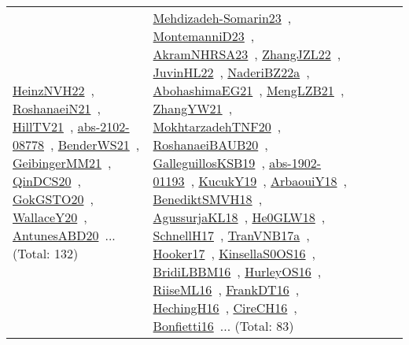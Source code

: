 {\begin{longtable}{lp{3cm}>{\raggedright\arraybackslash}p{6cm}>{\raggedright\arraybackslash}p{6cm}>{\raggedright\arraybackslash}p{8cm}}
\href{../works/HeinzNVH22.pdf}{HeinzNVH22}~\cite{HeinzNVH22}, \href{../works/RoshanaeiN21.pdf}{RoshanaeiN21}~\cite{RoshanaeiN21}, \href{../works/HillTV21.pdf}{HillTV21}~\cite{HillTV21}, \href{../works/abs-2102-08778.pdf}{abs-2102-08778}~\cite{abs-2102-08778}, \href{../works/BenderWS21.pdf}{BenderWS21}~\cite{BenderWS21}, \href{../works/GeibingerMM21.pdf}{GeibingerMM21}~\cite{GeibingerMM21}, \href{../works/QinDCS20.pdf}{QinDCS20}~\cite{QinDCS20}, \href{../works/GokGSTO20.pdf}{GokGSTO20}~\cite{GokGSTO20}, \href{../works/WallaceY20.pdf}{WallaceY20}~\cite{WallaceY20}, \href{../works/AntunesABD20.pdf}{AntunesABD20}~\cite{AntunesABD20}... (Total: 132) & \href{../works/Mehdizadeh-Somarin23.pdf}{Mehdizadeh-Somarin23}~\cite{Mehdizadeh-Somarin23}, \href{../works/MontemanniD23.pdf}{MontemanniD23}~\cite{MontemanniD23}, \href{../works/AkramNHRSA23.pdf}{AkramNHRSA23}~\cite{AkramNHRSA23}, \href{../works/ZhangJZL22.pdf}{ZhangJZL22}~\cite{ZhangJZL22}, \href{../works/JuvinHL22.pdf}{JuvinHL22}~\cite{JuvinHL22}, \href{../works/NaderiBZ22a.pdf}{NaderiBZ22a}~\cite{NaderiBZ22a}, \href{../works/AbohashimaEG21.pdf}{AbohashimaEG21}~\cite{AbohashimaEG21}, \href{../works/MengLZB21.pdf}{MengLZB21}~\cite{MengLZB21}, \href{../works/ZhangYW21.pdf}{ZhangYW21}~\cite{ZhangYW21}, \href{../works/MokhtarzadehTNF20.pdf}{MokhtarzadehTNF20}~\cite{MokhtarzadehTNF20}, \href{../works/RoshanaeiBAUB20.pdf}{RoshanaeiBAUB20}~\cite{RoshanaeiBAUB20}, \href{../works/GalleguillosKSB19.pdf}{GalleguillosKSB19}~\cite{GalleguillosKSB19}, \href{../works/abs-1902-01193.pdf}{abs-1902-01193}~\cite{abs-1902-01193}, \href{../works/KucukY19.pdf}{KucukY19}~\cite{KucukY19}, \href{../works/ArbaouiY18.pdf}{ArbaouiY18}~\cite{ArbaouiY18}, \href{../works/BenediktSMVH18.pdf}{BenediktSMVH18}~\cite{BenediktSMVH18}, \href{../works/AgussurjaKL18.pdf}{AgussurjaKL18}~\cite{AgussurjaKL18}, \href{../works/He0GLW18.pdf}{He0GLW18}~\cite{He0GLW18}, \href{../works/SchnellH17.pdf}{SchnellH17}~\cite{SchnellH17}, \href{../works/TranVNB17a.pdf}{TranVNB17a}~\cite{TranVNB17a}, \href{../works/Hooker17.pdf}{Hooker17}~\cite{Hooker17}, \href{../works/KinsellaS0OS16.pdf}{KinsellaS0OS16}~\cite{KinsellaS0OS16}, \href{../works/BridiLBBM16.pdf}{BridiLBBM16}~\cite{BridiLBBM16}, \href{../works/HurleyOS16.pdf}{HurleyOS16}~\cite{HurleyOS16}, \href{../works/RiiseML16.pdf}{RiiseML16}~\cite{RiiseML16}, \href{../works/FrankDT16.pdf}{FrankDT16}~\cite{FrankDT16}, \href{../works/HechingH16.pdf}{HechingH16}~\cite{HechingH16}, \href{../works/CireCH16.pdf}{CireCH16}~\cite{CireCH16}, \href{../works/Bonfietti16.pdf}{Bonfietti16}~\cite{Bonfietti16}... (Total: 83)\\

\end{longtable}}
